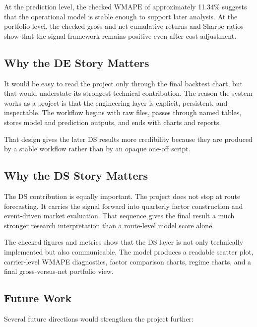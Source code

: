 \documentclass[11pt,a4paper]{article}
\newcommand{\WMAPE}{\mathrm{WMAPE}}
\begin{document}
At the prediction level, the checked $\WMAPE$ of approximately 11.34\% suggests
that the operational model is stable enough to support later analysis. At the
portfolio level, the checked gross and net cumulative returns and Sharpe ratios
show that the signal framework remains positive even after cost adjustment.

\subsection{Why the DE Story Matters}

It would be easy to read the project only through the final backtest chart, but
that would understate its strongest technical contribution. The reason the
system works as a project is that the engineering layer is explicit, persistent,
and inspectable. The workflow begins with raw files, passes through named
tables, stores model and prediction outputs, and ends with charts and reports.

That design gives the later DS results more credibility because they are
produced by a stable workflow rather than by an opaque one-off script.

\subsection{Why the DS Story Matters}

The DS contribution is equally important. The project does not stop at route
forecasting. It carries the signal forward into quarterly factor construction
and event-driven market evaluation. That sequence gives the final result a much
stronger research interpretation than a route-level model score alone.

The checked figures and metrics show that the DS layer is not only technically
implemented but also communicable. The model produces a readable scatter plot,
carrier-level WMAPE diagnostics, factor comparison charts, regime charts, and a
final gross-versus-net portfolio view.

\subsection{Future Work}

Several future directions would strengthen the project further:
\end{document}
